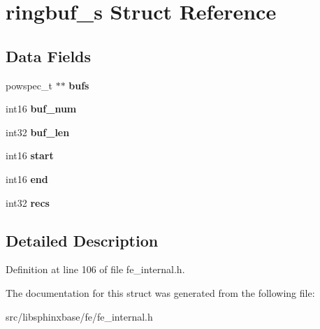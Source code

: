 \section{ringbuf\+\_\+s Struct Reference}
\label{structringbuf__s}
\subsection*{Data Fields}
\begin{DoxyCompactItemize}
\item 
powspec\+\_\+t $\ast$$\ast$ {\bfseries bufs}\label{structringbuf__s_a11a217fc621fe0cb09b74008df26ef24}

\item 
int16 {\bfseries buf\+\_\+num}\label{structringbuf__s_a86c68057bfd5ee118d838dddb2251c08}

\item 
int32 {\bfseries buf\+\_\+len}\label{structringbuf__s_ae7dcac923c44e2c3de82bc53b143be81}

\item 
int16 {\bfseries start}\label{structringbuf__s_a34ff0a330e7157010c31c6769e6ca5f9}

\item 
int16 {\bfseries end}\label{structringbuf__s_a0ae2bcd01e5ca350dacf68186ac99d7c}

\item 
int32 {\bfseries recs}\label{structringbuf__s_a2e2100e3870f3d12fb9d1f0f441b75ee}

\end{DoxyCompactItemize}


\subsection{Detailed Description}


Definition at line 106 of file fe\+\_\+internal.\+h.



The documentation for this struct was generated from the following file\+:\begin{DoxyCompactItemize}
\item 
src/libsphinxbase/fe/fe\+\_\+internal.\+h\end{DoxyCompactItemize}
